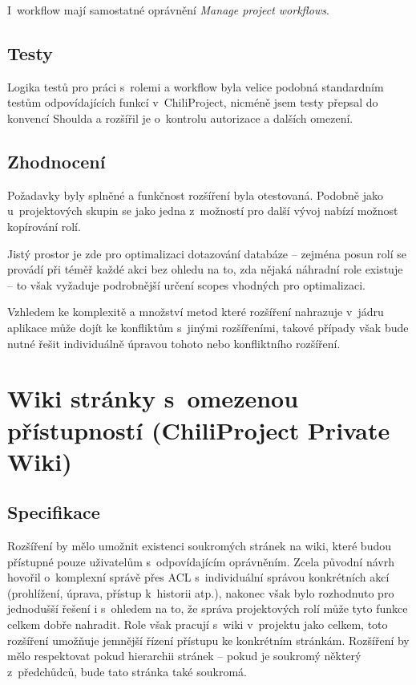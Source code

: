 \documentclass[thesis=B,czech]{FITthesis}[2012/05/02]
\begin{document}
I~workflow mají samostatné oprávnění \emph{Manage project workflows}.

\subsection{Testy}

Logika testů pro práci s~rolemi a workflow byla velice podobná
standardním testům odpovídajících funkcí v~ChiliProject, nicméně jsem
testy přepsal do konvencí Shoulda a rozšířil je o~kontrolu autorizace a
dalších omezení.

\subsection{Zhodnocení}

Požadavky byly splněné a funkčnost rozšíření byla otestovaná. Podobně
jako u~projektových skupin se jako jedna z~možností pro další vývoj
nabízí možnost kopírování rolí.

Jistý prostor je zde pro optimalizaci dotazování databáze -- zejména
posun rolí se provádí při téměř každé akci bez ohledu na to, zda nějaká
náhradní role existuje -- to však vyžaduje podrobnější určení
\glspl{scope} vhodných pro optimalizaci.

Vzhledem ke komplexitě a množství metod které rozšíření nahrazuje
v~jádru aplikace může dojít ke konfliktům s~jinými rozšířeními, takové
případy však bude nutné řešit individuálně úpravou tohoto nebo
konfliktního rozšíření.

\section[Wiki stránky s~omezenou přístupností]{Wiki stránky s~omezenou přístupností (ChiliProject Private
Wiki)}
\label{sec:private_wiki}

\subsection{Specifikace}

Rozšíření by mělo umožnit existenci soukromých stránek na \gls{wiki},
které budou přístupné pouze uživatelům s~odpovídajícím oprávněním. Zcela
původní návrh hovořil o~komplexní správě přes \gls{ACL} s~individuální
správou konkrétních akcí (prohlížení, úprava, přístup k~historii atp.),
nakonec však bylo rozhodnuto pro jednodušší řešení i s~ohledem na to, že
správa projektových rolí může tyto funkce celkem dobře nahradit. Role
však pracují s~wiki v~projektu jako celkem, toto rozšíření umožňuje
jemnější řízení přístupu ke konkrétním stránkám. Rozšíření by mělo
respektovat pokud hierarchii stránek -- pokud je soukromý některý
z~předchůdců, bude tato stránka také soukromá.
\end{document}
